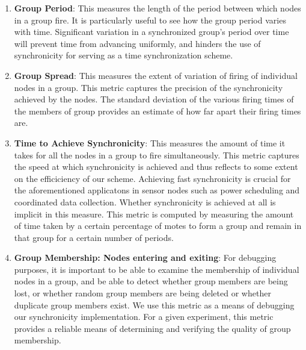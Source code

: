 \begin{enumerate}

\item {\bf Group Period}: This measures the length of the period between
which nodes in a group fire.  It is particularly useful to see how the
group period varies with time. Significant variation in a synchronized 
group's period over time will prevent time from advancing uniformly, and
hinders the use of synchronicity for serving as a time synchronization
scheme.

\item {\bf Group Spread}: This measures the extent of variation of 
firing of individual nodes in a group.  This metric captures the precision
of the synchronicity achieved by the nodes.
The standard deviation of the various firing times of the members of group
provides an estimate of how far apart their firing times are.

\item {\bf Time to Achieve Synchronicity}: This measures the 
amount of time it takes for all the nodes in a group to fire 
simultaneously. This metric captures the speed at which synchronicity
is achieved and thus reflects to some extent on the efficiciency of 
our scheme.  Achieving fast synchronicity is crucial for the aforementioned
applicatons in sensor nodes such as power scheduling and coordinated 
data collection.  Whether synchronicity is achieved at all is implicit
in this measure.
This metric is computed by measuring the amount of time taken by 
a certain percentage of motes to form a group and remain in that group
for a certain number of periods.

\item {\bf Group Membership: Nodes entering and exiting}: 
For debugging purposes, it is important to be able to examine 
the membership of individual nodes in a group, and be able to detect whether
group members are being lost, or whether random group members are being
deleted or whether duplicate group members exist.
We use this metric as a means of debugging our 
synchronicity implementation. For a given experiment, this metric
provides a reliable means of determining and verifying 
the quality of group membership.  
\end{enumerate}





